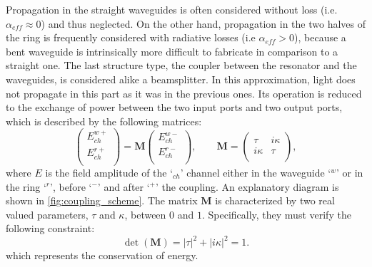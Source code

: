 Propagation in the straight waveguides is often considered without loss (i.e. $\alpha_{eff}\approx 0$) and thus neglected.
On the other hand, propagation in the two halves of the ring is frequently considered with radiative losses (i.e $\alpha_{eff}> 0$), because a bent waveguide is intrinsically more difficult to fabricate in comparison to a straight one.
The last structure type, the coupler between the resonator and the waveguides, is considered alike a beamsplitter.
In this approximation, light does not propagate in this part as it was in the previous ones.
Its operation is reduced to the exchange of power between the two input ports and two output ports, which is described by the following matrices:
\begin{equation}
\begin{pmatrix}
E^{w+}_{ch} \\
E^{r+}_{ch} \\
\end{pmatrix} = \textbf{M}
\begin{pmatrix}
E^{w-}_{ch} \\
E^{r-}_{ch} \\
\end{pmatrix}, \qquad \textbf{M} = 
\begin{pmatrix}
\tau & i\kappa \\
i\kappa & \tau \\
\end{pmatrix},
\end{equation}
where $E$ is the field amplitude of the `$_{ch}$' channel either in the waveguide `$^w$' or in the ring `$^r$', before `$^-$' and after `$^+$' the coupling.
An explanatory diagram is shown in \autoref{fig:coupling_scheme}.
The matrix $\textbf{M}$ is characterized by two real valued parameters, $\tau$ and $\kappa$, between $0$ and $1$.
Specifically, they must verify the following constraint:
\begin{equation}
\det\left(\textbf{M}\right) = |\tau|^2 + |i\kappa|^2 = 1.
\end{equation}
which represents the conservation of energy.

